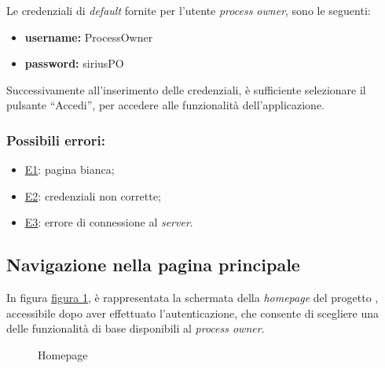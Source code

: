 Le credenziali di \textit{default} fornite per l'utente \textit{process owner}, sono le seguenti:
\begin{itemize}
\item \textbf{username:} ProcessOwner
\item \textbf{password:} siriusPO
\end{itemize}
Successivamente all'inserimento delle credenziali, è sufficiente selezionare il pulsante ``Accedi'', per accedere alle funzionalità dell'applicazione.

\subsubsection*{Possibili errori:}
\begin{itemize}
\item \hyperref[e1]{E1}: pagina bianca;
\item \hyperref[e2]{E2}: credenziali non corrette;
\item \hyperref[e3]{E3}: errore di connessione al \textit{server}.
\end{itemize}


\subsection{Navigazione nella pagina principale}
\label{home}
In figura \hyperref[fig:Fhome]{figura \ref{fig:Fhome}}, è rappresentata la schermata della \textit{homepage} del progetto \progetto{}, accessibile dopo aver effettuato l'autenticazione, che consente di scegliere una delle funzionalità di base disponibili al \textit{process owner}.

\begin{figure}[H] \centering 
{} \caption{Homepage}
\label{fig:Fhome}
\end{figure}


